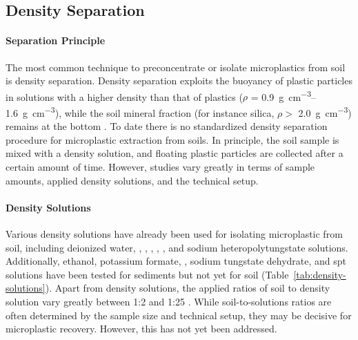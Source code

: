 \subsection{Density Separation}
\label{sec:analytical-techniques:density-separation}

\paragraph{Separation Principle}

The most common technique to preconcentrate or isolate microplastics from soil is density separation. Density separation exploits the buoyancy of plastic particles in solutions with a higher density than that of plastics ($\rho$ = \SIrange{0.9}{1.6}{\gram\per\cubic\centi\meter}), while the soil mineral fraction (for instance silica, $\rho >$ \SI{2.0}{\gram\per\cubic\centi\meter}) remains at the bottom \citep{EndersEvaluation2020,LiuAnalytical2020}. To date there is no standardized density separation procedure for microplastic extraction from soils. In principle, the soil sample is mixed with a density solution, and floating plastic particles are collected after a certain amount of time. However, studies vary greatly in terms of sample amounts, applied density solutions, and the technical setup.

\paragraph{Density Solutions}

Various density solutions have already been used for isolating microplastic from soil, including deionized water, , ,  , , , and sodium heteropolytungstate solutions. Additionally, ethanol, potassium formate, , sodium tungstate dehydrate, and \ac{spt} solutions have been tested for sediments but not yet for soil (Table~\ref{tab:density-solutions}). Apart from density solutions, the applied ratios of soil to density solution vary greatly between 1:2 \citep{ChenMixing2020} and 1:25 \citep{ZubrisSynthetic2005}.
While soil-to-solutions ratios are often determined by the sample size and technical setup, they may be decisive for microplastic recovery. However, this has not yet been addressed.

